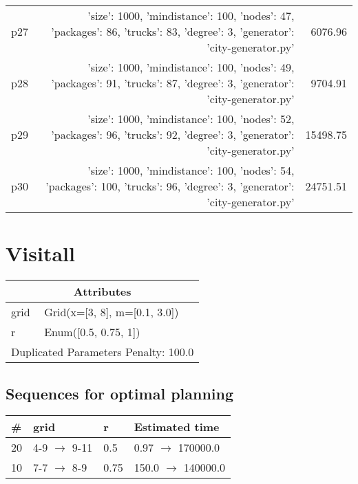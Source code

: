 \documentclass{article}
\begin{document}
\begin{center}
\begin{tabular}{@{}l|r|r@{}}
  p27&{'size': 1000, 'mindistance': 100, 'nodes': 47, 'packages': 86, 'trucks': 83, 'degree': 3, 'generator': 'city-generator.py'}&6076.96\\
  p28&{'size': 1000, 'mindistance': 100, 'nodes': 49, 'packages': 91, 'trucks': 87, 'degree': 3, 'generator': 'city-generator.py'}&9704.91\\
  p29&{'size': 1000, 'mindistance': 100, 'nodes': 52, 'packages': 96, 'trucks': 92, 'degree': 3, 'generator': 'city-generator.py'}&15498.75\\
  p30&{'size': 1000, 'mindistance': 100, 'nodes': 54, 'packages': 100, 'trucks': 96, 'degree': 3, 'generator': 'city-generator.py'}&24751.51
                            \end{tabular}
                            \end{center}
                    
                            \newpage \section{Visitall}
                    \begin{center}
                    \begin{tabular}{@{}p{}p{}@{}}
                    \multicolumn{2}{c}{\bf \large Attributes}\\\midrule
                    grid & Grid(x=[3, 8], m=[0.1, 3.0])\\
r & Enum([0.5, 0.75, 1]) \\\midrule
                    \multicolumn{2}{l}{Duplicated Parameters Penalty: 100.0}
                    \end{tabular}
                    \end{center}
                
                            \subsection*{Sequences for optimal planning}

                            \begin{center}
                            \begin{tabular}{@{}l|l|l|l@{}}
                            \# & grid & r & Estimated time\\\midrule
                            20&4-9 $\rightarrow$ 9-11&0.5&0.97 $\rightarrow$ 170000.0\\
10&7-7 $\rightarrow$ 8-9&0.75&150.0 $\rightarrow$ 140000.0
                            \end{tabular}
                            \end{center}
                    
\end{document}
